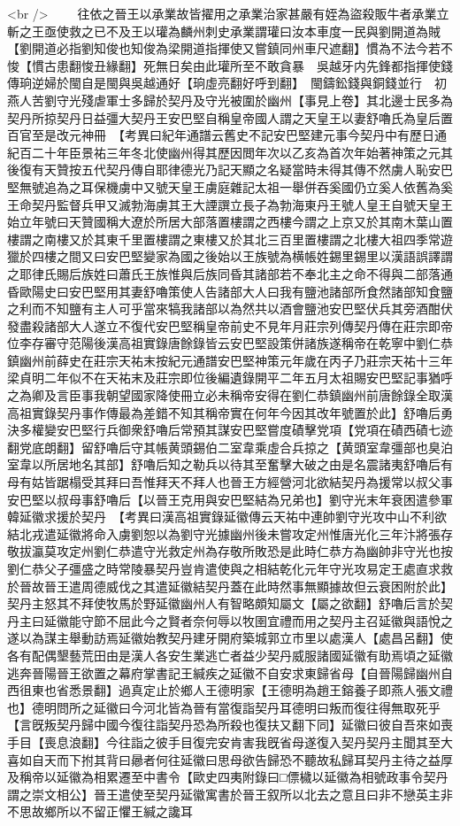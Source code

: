 <br />
　　往依之晉王以承業故皆擢用之承業治家甚嚴有姪為盜殺販牛者承業立斬之王亟使救之已不及王以瓘為麟州刺史承業謂瓘曰汝本車度一民與劉開道為賊【劉開道必指劉知俊也知俊為梁開道指揮使又嘗鎮同州車尺遮翻】慣為不法今若不悛【慣古患翻悛丑緣翻】死無日矣由此瓘所至不敢貪暴　吳越牙内先鋒都指揮使錢傳珦逆婦於閩自是閩與吳越通好【珦虛亮翻好呼到翻】　閩鑄鈆錢與銅錢並行　初燕人苦劉守光殘虐軍士多歸於契丹及守光被圍於幽州【事見上卷】其北邊士民多為契丹所掠契丹日益彊大契丹王安巴堅自稱皇帝國人謂之天皇王以妻舒嚕氏為皇后置百官至是改元神冊　【考異曰紀年通譜云舊史不記安巴堅建元事今契丹中有歷日通紀百二十年臣景祐三年冬北使幽州得其歷因閲年次以乙亥為首次年始著神策之元其後復有天贊按五代契丹傳自耶律德光乃記天顯之名疑當時未得其傳不然虜人恥安巴堅無號追為之耳保機虜中又號天皇王虜庭雜記太祖一舉併吞奚國仍立奚人依舊為奚王命契丹監督兵甲又滅勃海虜其王大諲譔立長子為勃海東丹王號人皇王自號天皇王始立年號曰天贊國稱大遼於所居大部落置樓謂之西樓今謂之上京又於其南木葉山置樓謂之南樓又於其東千里置樓謂之東樓又於其北三百里置樓謂之北樓大祖四季常遊獵於四樓之間又曰安巴堅變家為國之後始以王族號為横帳姓錫里錫里以漢語誤譯謂之耶律氏賜后族姓曰蕭氏王族惟與后族同昏其諸部若不奉北主之命不得與二部落通昏歐陽史曰安巴堅用其妻舒嚕策使人告諸部大人曰我有鹽池諸部所食然諸部知食鹽之利而不知鹽有主人可乎當來犒我諸部以為然共以酒會鹽池安巴堅伏兵其旁酒酣伏發盡殺諸部大人遂立不復代安巴堅稱皇帝前史不見年月莊宗列傳契丹傳在莊宗即帝位李存審守范陽後漢高祖實錄唐餘錄皆云安巴堅設策併諸族遂稱帝在乾寧中劉仁恭鎮幽州前薛史在莊宗天祐末按紀元通譜安巴堅神策元年歲在丙子乃莊宗天祐十三年梁貞明二年似不在天祐末及莊宗即位後編遺錄開平二年五月太祖賜安巴堅記事猶呼之為卿及言臣事我朝望國家降使冊立必未稱帝安得在劉仁恭鎮幽州前唐餘錄全取漢高祖實錄契丹事作傳最為差錯不知其稱帝實在何年今因其改年號置於此】舒嚕后勇決多權變安巴堅行兵御衆舒嚕后常預其謀安巴堅嘗度磧擊党項【党項在磧西磧七迹翻党底朗翻】留舒嚕后守其帳黄頭錫伯二室韋乘虛合兵掠之【黄頭室韋彊部也臭泊室韋以所居地名其部】舒嚕后知之勒兵以待其至奮擊大破之由是名震諸夷舒嚕后有母有姑皆踞榻受其拜曰吾惟拜天不拜人也晉王方經營河北欲結契丹為援常以叔父事安巴堅以叔母事舒嚕后【以晉王克用與安巴堅結為兄弟也】劉守光末年衰困遣參軍韓延徽求援於契丹　【考異曰漢高祖實錄延徽傳云天祐中連帥劉守光攻中山不利欲結北戎遣延徽將命入虜劉恕以為劉守光據幽州後未嘗攻定州惟唐光化三年汴將張存敬拔瀛莫攻定州劉仁恭遣守光救定州為存敬所敗恐是此時仁恭方為幽帥非守光也按劉仁恭父子彊盛之時常陵暴契丹豈肯遣使與之相結乾化元年守光攻易定王處直求救於晉故晉王遣周德威伐之其遣延徽結契丹蓋在此時然事無顯據故但云衰困附於此】契丹主怒其不拜使牧馬於野延徽幽州人有智略頗知屬文【屬之欲翻】舒嚕后言於契丹主曰延徽能守節不屈此今之賢者奈何辱以牧圉宜禮而用之契丹主召延徽與語悅之遂以為謀主舉動訪焉延徽始教契丹建牙開府築城郭立市里以處漢人【處昌呂翻】使各有配偶墾藝荒田由是漢人各安生業逃亡者益少契丹威服諸國延徽有助焉頃之延徽逃奔晉陽晉王欲置之幕府掌書記王緘疾之延徽不自安求東歸省母【自晉陽歸幽州自西徂東也省悉景翻】過真定止於鄉人王德明家【王德明為趙王鎔養子即燕人張文禮也】德明問所之延徽曰今河北皆為晉有當復詣契丹耳德明曰叛而復往得無取死乎【言旣叛契丹歸中國今復往詣契丹恐為所殺也復扶又翻下同】延徽曰彼自吾來如喪手目【喪息浪翻】今往詣之彼手目復完安肯害我旣省母遂復入契丹契丹主聞其至大喜如自天而下拊其背曰曏者何往延徽曰思母欲告歸恐不聽故私歸耳契丹主待之益厚及稱帝以延徽為相累遷至中書令【歐史四夷附錄曰□僄檅以延徽為相號政事令契丹謂之崇文相公】晉王遣使至契丹延徽寓書於晉王叙所以北去之意且曰非不戀英主非不思故鄉所以不留正懼王緘之讒耳